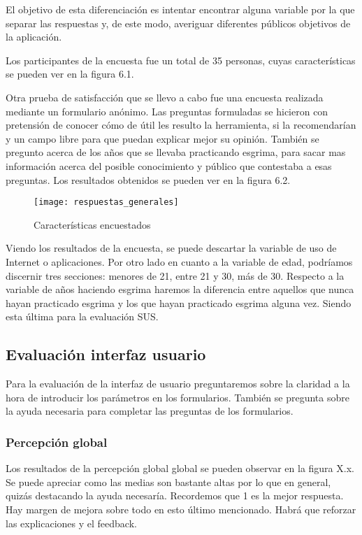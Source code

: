 El objetivo de esta diferenciación es intentar encontrar alguna variable por la que separar
las respuestas y, de este modo, averiguar diferentes públicos objetivos de la aplicación.

Los participantes de la encuesta fue un total de 35 personas, cuyas características se pueden ver en la figura 6.1.

Otra prueba de satisfacción que se llevo a cabo fue una encuesta realizada mediante un formulario
anónimo. Las preguntas formuladas se hicieron con pretensión de conocer cómo de útil les resulto
la herramienta, si la recomendarían y un campo libre para que puedan explicar mejor su opinión.
También se pregunto acerca de los años que se llevaba practicando esgrima, para sacar mas información
acerca del posible conocimiento y público que contestaba a esas preguntas.
Los resultados obtenidos se pueden ver en la figura 6.2.

\begin{figure}[htb]
  \centering
  \texttt{[image: respuestas\_generales]}
  \caption[Características encuestados]{Características encuestados}
  \label{fig:Características encuestados}
\end{figure}

Viendo los resultados de la encuesta, se puede descartar la variable de uso de Internet o aplicaciones.
Por otro lado en cuanto a la variable de edad, podríamos discernir tres secciones: menores de 21, entre 21
y 30, más de 30. Respecto a la variable de años haciendo esgrima haremos la diferencia entre aquellos
que nunca hayan practicado esgrima y los que hayan practicado esgrima alguna vez. Siendo esta última
para la evaluación SUS.

\subsection{Evaluación interfaz usuario}

Para la evaluación de la interfaz de usuario preguntaremos sobre la claridad a la hora de introducir
los parámetros en los formularios. También se pregunta sobre la ayuda necesaria para completar las preguntas de los formularios.

\subsubsection{Percepción global}

Los resultados de la percepción global global se pueden observar en la figura X.x. Se puede apreciar
como las medias son bastante altas por lo que en general, quizás destacando la ayuda necesaría.
Recordemos que 1 es la mejor respuesta. Hay margen de mejora sobre todo en esto último mencionado.
Habrá que reforzar las explicaciones y el feedback.

